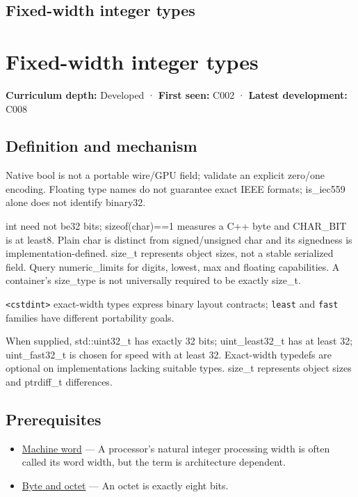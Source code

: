 \hypertarget{appendix-cc04044b5782}{}
\section*{Fixed-width integer types}
\chapter{Fixed-width integer types}\label{appendix-cc04044b5782-fixed-width-integer-types}

\textbf{Curriculum depth:} Developed · \textbf{First seen:} C002 · \textbf{Latest development:} C008

\section{Definition and mechanism}\label{appendix-cc04044b5782-definition-and-mechanism}

Native bool is not a portable wire/GPU field; validate an explicit zero/one encoding. Floating type names do not guarantee exact IEEE formats; is\_iec559 alone does not identify binary32.

int need not be32 bits; sizeof(char)==1 measures a C++ byte and CHAR\_BIT is at least8. Plain char is distinct from signed/unsigned char and its signedness is implementation-defined. size\_t represents object sizes, not a stable serialized field. Query numeric\_limits for digits, lowest, max and floating capabilities. A container's size\_type is not universally required to be exactly size\_t.

\texttt{\textless{}cstdint\textgreater{}} exact-width types express binary layout contracts; \texttt{least} and \texttt{fast} families have different portability goals.

When supplied, std::uint32\_t has exactly 32 bits; uint\_least32\_t has at least 32; uint\_fast32\_t is chosen for speed with at least 32. Exact-width typedefs are optional on implementations lacking suitable types. size\_t represents object sizes and ptrdiff\_t differences.

\section{Prerequisites}\label{appendix-cc04044b5782-prerequisites}

\begin{itemize}
\tightlist
\item
  \hyperref[appendix-d67a19507dc5]{Machine word} --- A processor's natural integer processing width is often called its word width, but the term is architecture dependent.
\item
  \hyperref[appendix-5bee2df85484]{Byte and octet} --- An octet is exactly eight bits.
\end{itemize}

